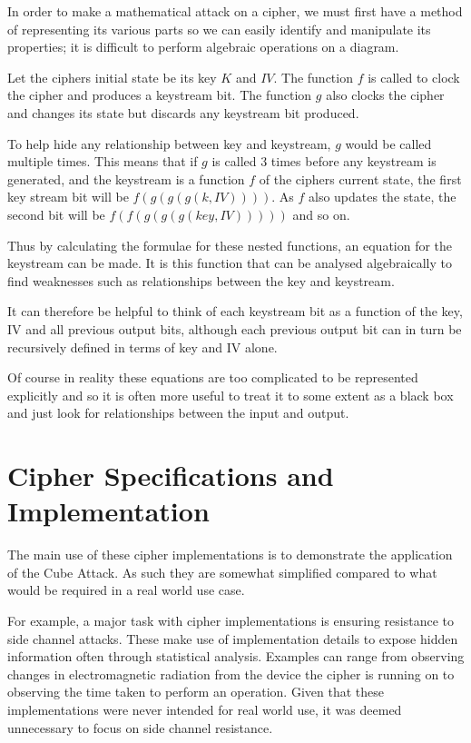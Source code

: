 \documentclass{report}
\begin{document}
In order to make a mathematical attack on a cipher, we must first have a method
of representing its various parts so we can easily identify and manipulate its properties; it is difficult to perform algebraic operations on a diagram.

Let the ciphers initial state be its key $K$ and $IV$. The function $f$ is called to clock the cipher and produces a keystream bit. The function $g$ also clocks the cipher and changes its state but discards any keystream bit produced.

To help hide any relationship between key and keystream, $g$ would be called multiple times. This means that if $g$ is called 3 times before any keystream is generated, and the keystream is a function $f$ of the ciphers current state, the first key stream bit will be $f(g(g(g(k, IV))))$. As $f$ also updates the state, the second bit will be $f(f(g(g(g(key, IV)))))$ and so on.

Thus by calculating the formulae for these nested functions, an equation for the keystream can be made. It is this function that can be analysed algebraically to find weaknesses such as relationships between the key and keystream.

It can therefore be helpful to think of each keystream bit as a function of the key, IV and all previous output bits, although each previous output bit can in turn be recursively defined in terms of key and IV alone.

Of course in reality these equations are too complicated to be represented explicitly and so it is often more useful to treat it to some extent as a black box and just look for relationships between the input and output.
\chapter{Cipher Specifications  and Implementation}
The main use of these cipher implementations is to demonstrate the application of the Cube Attack. As such they are somewhat simplified compared to what would be required in a real world use case.

For example, a major task with cipher implementations is ensuring resistance to side channel attacks. These make use of implementation details to expose hidden information often through statistical analysis. Examples can range from observing changes in electromagnetic radiation from the device the cipher is running on\cite{electroSide} to observing the time taken to perform an operation\cite{timingAttack}. Given that these implementations were never intended for real world use, it was deemed unnecessary to focus on side channel resistance.
\end{document}
